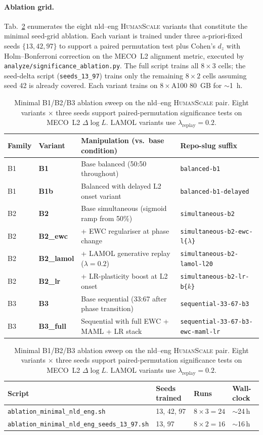 \paragraph{Ablation grid.} Tab.~\ref{tab:ablation-sweep} enumerates the eight nld--eng \textsc{HumanScale} variants that constitute the minimal seed-grid ablation. Each variant is trained under three a-priori-fixed seeds $\{13, 42, 97\}$ to support a paired permutation test plus Cohen's $d_z$ with Holm--Bonferroni correction on the MECO~L2 alignment metric, executed by \texttt{analyze/significance\_ablation.py}. The full script trains all $8\times 3$ cells; the seed-delta script (\texttt{seeds\_13\_97}) trains only the remaining $8\times 2$ cells assuming seed 42 is already covered. Each variant trains on $8\times$A100 80~GB for $\sim$1~h.

\begin{table}[t]
\centering
\small
\caption{Minimal B1/B2/B3 ablation sweep on the nld--eng \textsc{HumanScale} pair. Eight variants $\times$ three seeds support paired-permutation significance tests on MECO~L2 $\Delta\log L$. LAMOL variants use $\lambda_{\text{replay}}=0.2$.}
\label{tab:ablation-sweep}
\begin{tabular}{@{}l l l l@{}}
\toprule
Family & Variant & Manipulation (vs.\ base condition) & Repo-slug suffix \\
\midrule
B1 & \textbf{B1}        & Base balanced (50:50 throughout)          & \texttt{balanced-b1} \\
B1 & \textbf{B1b}       & Balanced with delayed L2 onset variant    & \texttt{balanced-b1-delayed} \\
\midrule
B2 & \textbf{B2}        & Base simultaneous (sigmoid ramp from 50\%) & \texttt{simultaneous-b2} \\
B2 & \textbf{B2\_ewc}   & + EWC regulariser at phase change         & \texttt{simultaneous-b2-ewc-l\{$\lambda$\}} \\
B2 & \textbf{B2\_lamol} & + LAMOL generative replay ($\lambda=0.2$) & \texttt{simultaneous-b2-lamol-l20} \\
B2 & \textbf{B2\_lr}    & + LR-plasticity boost at L2 onset         & \texttt{simultaneous-b2-lr-b\{$k$\}} \\
\midrule
B3 & \textbf{B3}        & Base sequential (33:67 after phase transition) & \texttt{sequential-33-67-b3} \\
B3 & \textbf{B3\_full}  & Sequential with full EWC + MAML + LR stack & \texttt{sequential-33-67-b3-ewc-maml-lr} \\
\bottomrule
\end{tabular}

\vspace{0.5em}
\begin{tabular}{@{}l l l l@{}}
\toprule
Script & Seeds trained & Runs & Wall-clock \\
\midrule
\texttt{ablation\_minimal\_nld\_eng.sh}        & 13, 42, 97 & $8\times 3 = 24$ & $\sim$24\,h \\
\texttt{ablation\_minimal\_nld\_eng\_seeds\_13\_97.sh} & 13, 97     & $8\times 2 = 16$ & $\sim$16\,h \\
\bottomrule
\end{tabular}
\end{table}
